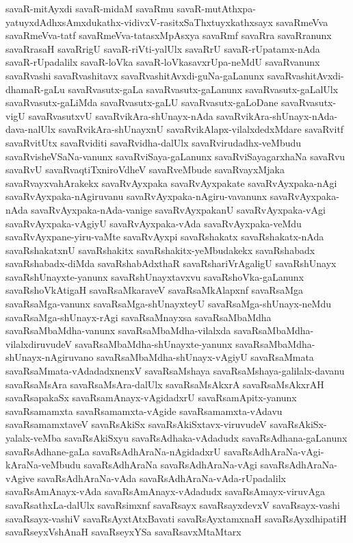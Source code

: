 {savaR-mitAyxdi
savaR-midaM
savaRmu
savaR-mutAthxpa-yatuyxdAdhxsAmxdukathx-vidivxV-rasitxSaThxtuyxkathxsayx
savaRmeVva
savaRmeVva-tatf
savaRmeVva-tatasxMpAsxya
savaRmf
savaRra
savaRranunx
savaRrasaH
savaRrigU
savaR-riVti-yalUlx
savaRrU
savaR-rUpatamx-nAda
savaR-rUpadalilx
savaR-loVka
savaR-loVkasavxrUpa-neMdU
savaRvanunx
savaRvashi
savaRvashitavx
savaRvashitAvxdi-guNa-gaLanunx
savaRvashitAvxdi-dhamaR-gaLu
savaRvasutx-gaLa
savaRvasutx-gaLanunx
savaRvasutx-gaLalUlx
savaRvasutx-gaLiMda
savaRvasutx-gaLU
savaRvasutx-gaLoDane
savaRvasutx-vigU
savaRvasutxvU
savaRvikAra-shUnayx-nAda
savaRvikAra-shUnayx-nAda-dava-nalUlx
savaRvikAra-shUnayxnU
savaRvikAlapx-vilalxdedxMdare
savaRvitf
savaRvitUtx
savaRviditi
savaRvidha-dalUlx
savaRvirudadhx-veMbudu
savaRvisheVSaNa-vanunx
savaRviSaya-gaLanunx
savaRviSayagarxhaNa
savaRvu
savaRvU
savaRvaqtiTxniroVdheV
savaRveMbude
savaRvayxMjaka
savaRvayxvahArakekx
savaRvAyxpaka
savaRvAyxpakate
savaRvAyxpaka-nAgi
savaRvAyxpaka-nAgiruvanu
savaRvAyxpaka-nAgiru-vavanunx
savaRvAyxpaka-nAda
savaRvAyxpaka-nAda-vanige
savaRvAyxpakanU
savaRvAyxpaka-vAgi
savaRvAyxpaka-vAgiyU
savaRvAyxpaka-vAda
savaRvAyxpaka-veMdu
savaRvAyxpane-yiru-vaMte
savaRvAyxpi
savaRshakatx
savaRshakatx-nAda
savaRshakatxnU
savaRshakitx
savaRshakitx-yeMbudakekx
savaRshabadx
savaRshabadx-diMda
savaRshabAdxthaR
savaRshariVrAgaligU
savaRshUnayx
savaRshUnayxte-yanunx
savaRshUnayxtavxvu
savaRshoVka-gaLanunx
savaRshoVkAtigaH
savaRsaMkaraveV
savaRsaMkAlapxnf
savaRsaMga
savaRsaMga-vanunx
savaRsaMga-shUnayxteyU
savaRsaMga-shUnayx-neMdu
savaRsaMga-shUnayx-rAgi
savaRsaMnayxsa
savaRsaMbaMdha
savaRsaMbaMdha-vanunx
savaRsaMbaMdha-vilalxda
savaRsaMbaMdha-vilalxdiruvudeV
savaRsaMbaMdha-shUnayxte-yanunx
savaRsaMbaMdha-shUnayx-nAgiruvano
savaRsaMbaMdha-shUnayx-vAgiyU
savaRsaMmata
savaRsaMmata-vAdadadxnenxV
savaRsaMshaya
savaRsaMshaya-galilalx-davanu
savaRsaMsAra
savaRsaMsAra-dalUlx
savaRsaMsAkxrA
savaRsaMsAkxrAH
savaRsapakaSx
savaRsamAnayx-vAgidadxrU
savaRsamApitx-yanunx
savaRsamamxta
savaRsamamxta-vAgide
savaRsamamxta-vAdavu
savaRsamamxtaveV
savaRsAkiSx
savaRsAkiSxtavx-viruvudeV
savaRsAkiSx-yalalx-veMba
savaRsAkiSxyu
savaRsAdhaka-vAdadudx
savaRsAdhana-gaLanunx
savaRsAdhane-gaLa
savaRsAdhAraNa-nAgidadxrU
savaRsAdhAraNa-vAgi-kAraNa-veMbudu
savaRsAdhAraNa
savaRsAdhAraNa-vAgi
savaRsAdhAraNa-vAgive
savaRsAdhAraNa-vAda
savaRsAdhAraNa-vAda-rUpadalilx
savaRsAmAnayx-vAda
savaRsAmAnayx-vAdadudx
savaRsAmayx-viruvAga
savaRsathxLa-dalUlx
savaRsimxnf
savaRsayx
savaRsayxdevxV
savaRsayx-vashi
savaRsayx-vashiV
savaRsAyxtAtxBavati
savaRsAyxtamxnaH
savaRsAyxdhipatiH
savaRseyxVshAnaH
savaRseyxYSa
savaRsavxMtaMtarx
}
